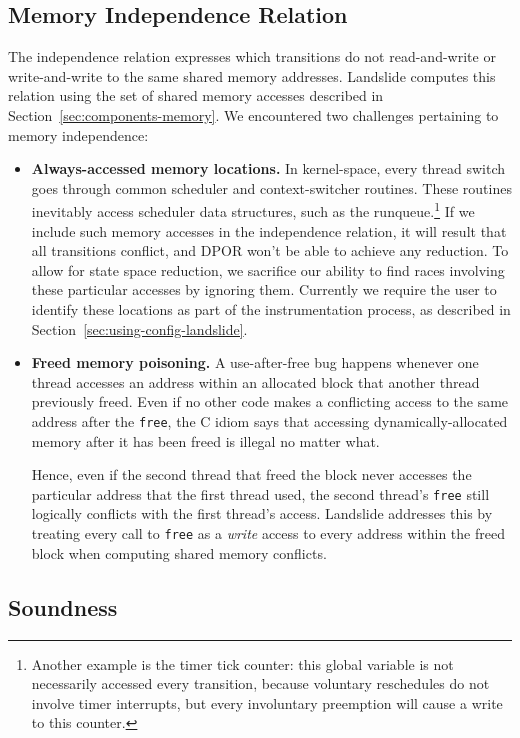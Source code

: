 \subsection{Memory Independence Relation}
\label{sec:por-independence}
The independence relation expresses which transitions do not read-and-write or write-and-write to the same shared memory addresses. Landslide computes this relation using the set of shared memory accesses described in Section~\ref{sec:components-memory}. We encountered two challenges pertaining to memory independence:

\begin{itemize}
	\item {\bf Always-accessed memory locations.}
		In kernel-space, every thread switch goes through common scheduler and context-switcher routines. These routines inevitably access scheduler data structures, such as the runqueue.\footnote{
		Another example is the timer tick counter: this global variable is not necessarily accessed every transition, because voluntary reschedules do not involve timer interrupts, but every involuntary preemption will cause a write to this counter.}
		If we include such memory accesses in the independence relation, it will result that all transitions conflict, and DPOR won't be able to achieve any reduction. To allow for state space reduction, we sacrifice our ability to find races involving these particular accesses by ignoring them. Currently we require the user to identify these locations as part of the instrumentation process, as described in Section~\ref{sec:using-config-landslide}.
	\item {\bf Freed memory poisoning.}
		A use-after-free bug happens whenever one thread accesses an address within an allocated block that another thread previously freed. Even if no other code makes a conflicting access to the same address after the \texttt{free}, the C idiom says that accessing dynamically-allocated memory after it has been freed is illegal no matter what.

		Hence, even if the second thread that freed the block never accesses the particular address that the first thread used, the second thread's \texttt{free} still logically conflicts with the first thread's access. Landslide addresses this by treating every call to \texttt{free} as a {\em write} access to every address within the freed block when computing shared memory conflicts.
\end{itemize}

\subsection{Soundness}

